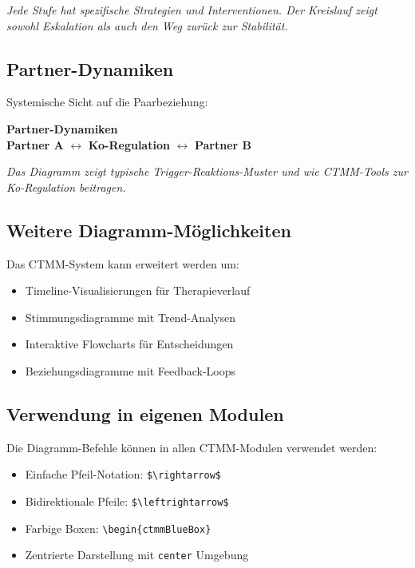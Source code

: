 \textit{Jede Stufe hat spezifische Strategien und Interventionen. Der Kreislauf zeigt sowohl Eskalation als auch den Weg zurück zur Stabilität.}

\newpage

\subsection*{\textcolor{ctmmRed}{Partner-Dynamiken}}

Systemische Sicht auf die Paarbeziehung:

\begin{center}
\begin{tcolorbox}[colback=ctmmRed!10!white,colframe=ctmmRed,width=12cm]
\centering
\textbf{Partner-Dynamiken}\\[0.5cm]
\textcolor{ctmmBlue}{\textbf{Partner A}} $\leftrightarrow$ \textcolor{ctmmGreen}{\textbf{Ko-Regulation}} $\leftrightarrow$ \textcolor{ctmmBlue}{\textbf{Partner B}}
\end{tcolorbox}
\end{center}

\textit{Das Diagramm zeigt typische Trigger-Reaktions-Muster und wie CTMM-Tools zur Ko-Regulation beitragen.}

\subsection*{\textcolor{ctmmGreen}{Weitere Diagramm-Möglichkeiten}}

\begin{ctmmGreenBox}[title=Zukünftige Erweiterungen]
Das CTMM-System kann erweitert werden um:
\begin{itemize}
  \item Timeline-Visualisierungen für Therapieverlauf
  \item Stimmungsdiagramme mit Trend-Analysen
  \item Interaktive Flowcharts für Entscheidungen
  \item Beziehungsdiagramme mit Feedback-Loops
\end{itemize}
\end{ctmmGreenBox}

\subsection*{\texorpdfstring{\textcolor{ctmmBlue}{Verwendung in eigenen Modulen}}{Verwendung in eigenen Modulen}}

\begin{ctmmBlueBox}[title=So nutzen Sie die Diagramme]
Die Diagramm-Befehle können in allen CTMM-Modulen verwendet werden:
\begin{itemize}
  \item Einfache Pfeil-Notation: \texttt{\$\textbackslash rightarrow\$}
  \item Bidirektionale Pfeile: \texttt{\$\textbackslash leftrightarrow\$}
  \item Farbige Boxen: \texttt{\textbackslash begin\{ctmmBlueBox\}}
  \item Zentrierte Darstellung mit \texttt{center} Umgebung
\end{itemize}
\end{ctmmBlueBox}

